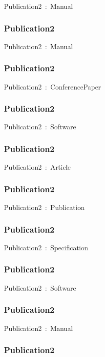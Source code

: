 \documentclass{article}
\begin{document}
Publication2~:~Manual

\subsubsection*{Publication2}

Publication2~:~Manual

\subsubsection*{Publication2}

Publication2~:~ConferencePaper

\subsubsection*{Publication2}

Publication2~:~Software

\subsubsection*{Publication2}

Publication2~:~Article

\subsubsection*{Publication2}

Publication2~:~Publication

\subsubsection*{Publication2}

Publication2~:~Specification

\subsubsection*{Publication2}

Publication2~:~Software

\subsubsection*{Publication2}

Publication2~:~Manual

\subsubsection*{Publication2}
\end{document}
